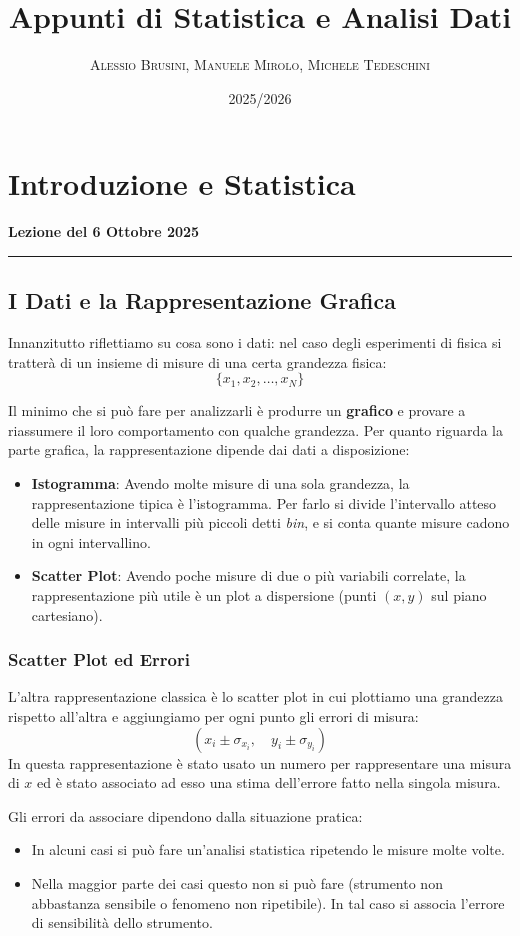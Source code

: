 \documentclass[a4paper,11pt]{article}
\title{\textbf{\Huge Appunti di Statistica e Analisi Dati}}
\author{\textsc{Alessio Brusini, Manuele Mirolo, Michele Tedeschini}}
\date{2025/2026}
\theoremstyle{remark}
\newcommand{\thelezione}{}
\newcommand{\lezione}[2]{
\newpage
\renewcommand{\thelezione}{#2} %
\section{#1}
\addcontentsline{toc}{subsection}{Data: #2}
\noindent\textbf{\color{RoyalBlue}Lezione del #2}\par\vspace{0.5em}\hrule\vspace{1em}
}
\begin{document}
\maketitle
\tableofcontents
\newpage



\lezione{Introduzione e Statistica}{6 Ottobre 2025}

\subsection{I Dati e la Rappresentazione Grafica}
Innanzitutto riflettiamo su cosa sono i dati: nel caso degli esperimenti di fisica si tratterà di un insieme di misure di una certa grandezza fisica:
\[ \{ x_1, x_2, \dots, x_N \} \]

Il minimo che si può fare per analizzarli è produrre un \textbf{grafico} e provare a riassumere il loro comportamento con qualche grandezza.
Per quanto riguarda la parte grafica, la rappresentazione dipende dai dati a disposizione:
\begin{itemize}
    \item \textbf{Istogramma}: Avendo molte misure di una sola grandezza, la rappresentazione tipica è l'istogramma. Per farlo si divide l'intervallo atteso delle misure in intervalli più piccoli detti \textit{bin}, e si conta quante misure cadono in ogni intervallino.
    \item \textbf{Scatter Plot}: Avendo poche misure di due o più variabili correlate, la rappresentazione più utile è un plot a dispersione (punti $(x,y)$ sul piano cartesiano).
\end{itemize}

\subsubsection{Scatter Plot ed Errori}
L'altra rappresentazione classica è lo scatter plot in cui plottiamo una grandezza rispetto all'altra e aggiungiamo per ogni punto gli errori di misura:
\[ (x_i \pm \sigma_{x_i}, \quad y_i \pm \sigma_{y_i}) \]
In questa rappresentazione è stato usato un numero per rappresentare una misura di $x$ ed è stato associato ad esso una stima dell'errore fatto nella singola misura.

Gli errori da associare dipendono dalla situazione pratica:
\begin{itemize}
    \item In alcuni casi si può fare un'analisi statistica ripetendo le misure molte volte.
    \item Nella maggior parte dei casi  questo non si può fare (strumento non abbastanza sensibile o fenomeno non ripetibile). In tal caso si associa l'errore di sensibilità dello strumento.
\end{itemize}
\end{document}
